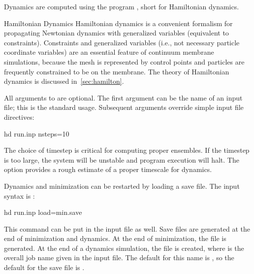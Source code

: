 

Dynamics are computed using the program , short for Hamiltonian dynamics. 

\begin{bcomment}{Hamiltonian Dynamics}
Hamiltonian dynamics is a convenient formalism for propagating Newtonian dynamics with generalized variables (equivalent to constraints). Constraints and generalized variables (i.e., not necessary particle coordinate variables) are an essential feature of continuum membrane simulations, because the mesh is represented by control points and particles are frequently constrained to be on the membrane. The theory of Hamiltonian dynamics is discussed in~\cref{sec:hamilton}. 
\end{bcomment}

All arguments to  are optional.
The first argument can be the name of an input file; this is the standard usage.
Subsequent arguments override simple input file directives:
\begin{command}
hd run.inp nsteps=10
\label{cmd:hd}
\end{command}



The choice of timestep is critical for computing proper ensembles. 
If the timestep is too large, the system will be unstable and program execution will halt.
The option  provides a rough estimate of a proper timescale for dynamics.


Dynamics and minimization can be restarted by loading a save file.
The input syntax is :
\begin{command}
hd run.inp load=min.save
\end{command}
This command can be put in the input file as well.
Save files are generated at the end of minimization and dynamics.
At the end of minimization, the file  is generated.
At the end of a dynamics simulation, the file  is created, where  is the overall job name given in the input file.
The default for this name is , so the default for the save file is .




